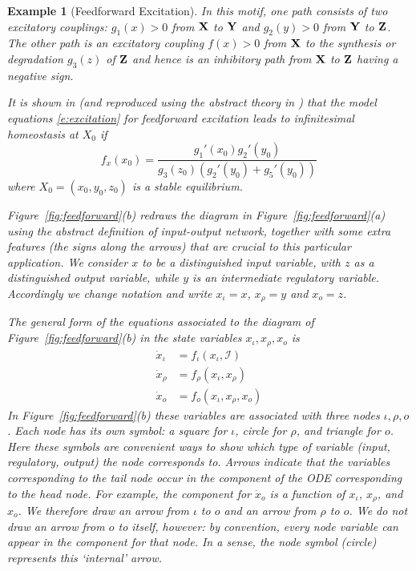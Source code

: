 \documentclass[a4paper,fleqn]{cas-dc}
\newcommand{\II}{{\mathcal I}}
\newtheorem{example}{Example}[section]
\begin{document}
\begin{example}[Feedforward Excitation]
In this motif, one path consists of two excitatory couplings: $g_1(x) > 0$ from $\bf X$ to $\bf Y$ and $g_2(y) >0$ from $\bf Y$ to $\bf Z$. 
The other path is an excitatory coupling $f(x) > 0$ from $\bf X$ to the synthesis or degradation $g_3(z)$ of $\bf Z$ and hence is an inhibitory path from $\bf X$ to $\bf Z$ having a negative sign.

It is shown in \cite{rbgsn2017} {(and reproduced using the abstract theory in \cite{wang2020})} that the model equations \eqref{e:excitation} for feedforward excitation leads to infinitesimal homeostasis at $X_0$ if 
\begin{equation} \label{e:cond_homeostase1}
f_x(x_0) = \frac{g_1'(x_0) g_2'(y_0)}{g_3(z_0)(g_2'(y_0) + g_5'(y_0))}
\end{equation}
where $X_0 = (x_0,y_0,z_0)$ is a stable equilibrium.  

Figure~\ref{fig:feedforward}(b) redraws the diagram in Figure~\ref{fig:feedforward}(a) using the abstract definition of input-output network, together with some extra features (the signs along the arrows) that are crucial to this particular application.
We consider $x$ to be a distinguished {\em input variable}, with $z$ as a distinguished {\em output variable}, while $y$ is an intermediate {\em regulatory variable}. 
Accordingly we change notation and write $x_\iota = x$, $x_\rho = y$ and $x_o = z$.

The general form of the equations associated to the diagram of Figure~\ref{fig:feedforward}(b) in the state variables $x_\iota, x_\rho, x_o$ is
\begin{equation} \label{e:feedforward}
\begin{split}
\dot{x}_\iota & = f_\iota(x_\iota,\II) \\
\dot{x}_\rho & = f_\rho(x_\iota,x_\rho) \\
\dot{x}_o & = f_o(x_\iota, x_\rho, x_o)
\end{split}
\end{equation}
In Figure~\ref{fig:feedforward}(b)
these variables are associated with three nodes $\iota, \rho, o$. 
Each node has its own symbol: a square for $\iota$, circle for $\rho$, and triangle for $o$.
Here these symbols are convenient ways to show which type of variable (input, regulatory, output) the node corresponds to. 
Arrows indicate that the variables corresponding to the tail node occur in the component of the ODE corresponding to the head node. 
For example, the component for $\dot{x}_o$ is a function of $x_\iota$, $x_\rho$, and $x_o$. 
We therefore draw an arrow from $\iota$ to $o$ and an arrow from $\rho$ to $o$. We do not draw an arrow from $o$ to itself, however: by convention, every node variable can appear in the component for that node. In a sense, the node symbol (circle) represents this `internal' arrow.


\end{example}
\end{document}
